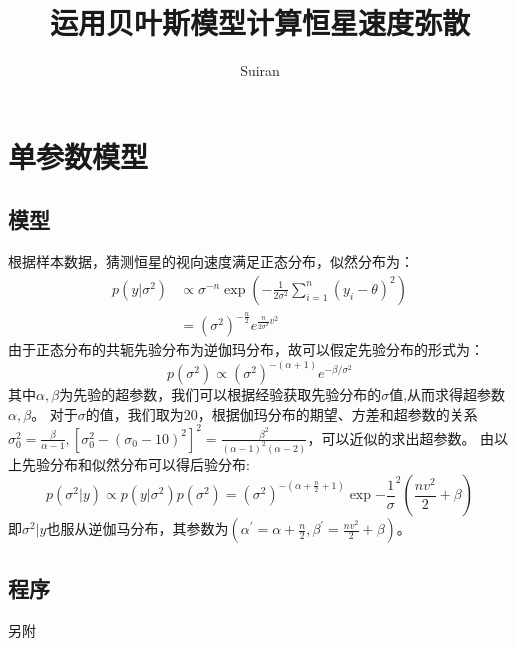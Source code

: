\documentclass[12pt, letterpaper]{article}
\title{运用贝叶斯模型计算恒星速度弥散}
\author{Suiran}
\begin{document}
\maketitle

\newpage
\section{单参数模型}
\subsection{模型}
根据样本数据，猜测恒星的视向速度满足正态分布，似然分布为：
$$\begin{aligned}
p(y|\sigma^2)&\propto \sigma^{-n}\exp\left(-\frac{1}{2\sigma^2}\sum^{n}_{i=1}(y_i-\theta)^2\right) \\
&=(\sigma^2)^{-\frac{n}{2}}e^{\frac{n}{2\sigma^2}v^2} 
\end{aligned}
$$
由于正态分布的共轭先验分布为逆伽玛分布，故可以假定先验分布的形式为：
$$p(\sigma^2)\propto(\sigma^2)^{-(\alpha+1)}e^{-\beta/\sigma^2}$$
其中$\alpha,\beta$为先验的超参数，我们可以根据经验获取先验分布的$\sigma$值,从而求得超参数$\alpha,\beta$。
对于$\sigma$的值，我们取为20，根据伽玛分布的期望、方差和超参数的关系$\sigma^2_0=\frac{\beta}{\alpha-1},[\sigma_0^2-(\sigma_0-10)^2]^2=\frac{\beta^2}{(\alpha-1)^2(\alpha-2)}$，可以近似的求出超参数。
由以上先验分布和似然分布可以得后验分布:
$$p(\sigma^2|y)\propto p(y|\sigma^2)p(\sigma^2)=(\sigma^2)^{-(\alpha+\frac n2+1)}\exp{-\frac 1\sigma^2(\frac{nv^2}{2}+\beta)}$$
即$\sigma^2|y$也服从逆伽马分布，其参数为$(\alpha^{\prime}=\alpha+\frac n2,\beta^{\prime}=\frac{nv^2}{2}+\beta)$。
\subsection{程序}
另附
\end{document}
